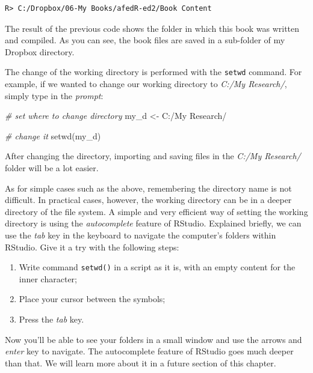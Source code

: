 \documentclass[
  12pt,
]{book}
\newenvironment{Shaded}{\begin{snugshade}}{\end{snugshade}}
\newcommand{\CommentTok}[1]{\textcolor[rgb]{0.37,0.37,0.37}{\textit{#1}}}
\newcommand{\FunctionTok}[1]{\textcolor[rgb]{0,0,0}{#1}}
\newcommand{\NormalTok}[1]{#1}
\newcommand{\OtherTok}[1]{\textcolor[rgb]{0.37,0.37,0.37}{#1}}
\newcommand{\StringTok}[1]{\textcolor[rgb]{0.5,0.5,0.5}{#1}}
\begin{document}
\begin{verbatim}
R> C:/Dropbox/06-My Books/afedR-ed2/Book Content
\end{verbatim}

The result of the previous code shows the folder in which this book was written and compiled. As you can see, the book files are saved in a sub-folder of my Dropbox directory.

The change of the working directory is performed with the \texttt{setwd} command. For example, if we wanted to change our working directory to \emph{C:/My Research/}, simply type in the \emph{prompt}: 

\begin{Shaded}
\begin{Highlighting}[]
\CommentTok{\# set where to change directory}
\NormalTok{my\_d }\OtherTok{\textless{}{-}} \StringTok{\textquotesingle{}C:/My Research/\textquotesingle{}}

\CommentTok{\# change it}
\FunctionTok{setwd}\NormalTok{(my\_d)}
\end{Highlighting}
\end{Shaded}

After changing the directory, importing and saving files in the \emph{C:/My Research/} folder will be a lot easier.

As for simple cases such as the above, remembering the directory name is not difficult. In practical cases, however, the working directory can be in a deeper directory of the file system. A simple and very efficient way of setting the working directory is using the \emph{autocomplete} feature of RStudio. Explained briefly, we can use the \emph{tab} key in the keyboard to navigate the computer's folders within RStudio. Give it a try with the following steps:

\begin{enumerate}
\def\labelenumi{\arabic{enumi})}
\item
  Write command \texttt{setwd(\textquotesingle{}\textquotesingle{})} in a script as it is, with an empty content for the inner character;
\item
  Place your cursor between the \texttt{\textquotesingle{}} symbols;
\item
  Press the \emph{tab} key.
\end{enumerate}

Now you'll be able to see your folders in a small window and use the arrows and \emph{enter} key to navigate. The autocomplete feature of RStudio goes much deeper than that. We will learn more about it in a future section of this chapter.
\end{document}
